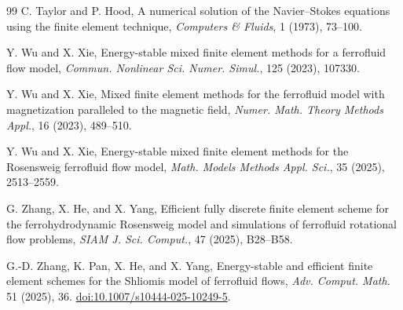 \documentclass[11pt,a4paper]{article}
\theoremstyle{definition}
\numberwithin{equation}{section}
\begin{document}
\begin{thebibliography}{99}
C. Taylor and P. Hood,
A numerical solution of the Navier--Stokes equations using the finite element technique,
\emph{Computers \& Fluids},
1 (1973), 73--100.


Y. Wu and X. Xie,
Energy-stable mixed finite element methods for a ferrofluid flow model,
\emph{Commun. Nonlinear Sci. Numer. Simul.}, 125 (2023), 107330.

Y. Wu and X. Xie,
Mixed finite element methods for the ferrofluid model with magnetization paralleled to the magnetic field,
\emph{Numer. Math. Theory Methods Appl.}, 16 (2023), 489--510.

Y. Wu and X. Xie,
Energy-stable mixed finite element methods for the Rosensweig ferrofluid flow model,
\emph{Math. Models Methods Appl. Sci.}, 35 (2025), 2513--2559.

G. Zhang, X. He, and X. Yang,
Efficient fully discrete finite element scheme for the ferrohydrodynamic Rosensweig model and simulations of ferrofluid rotational flow problems,
\emph{SIAM J. Sci. Comput.}, 47 (2025), B28--B58.


G.-D. Zhang, K. Pan, X. He, and X. Yang, Energy-stable and efficient finite element schemes for the Shliomis model of ferrofluid flows, \emph{Adv. Comput. Math.} 51 (2025), 36. \href{https://doi.org/10.1007/s10444-025-10249-5}{doi:10.1007/s10444-025-10249-5}.

\end{thebibliography}
\end{document}
